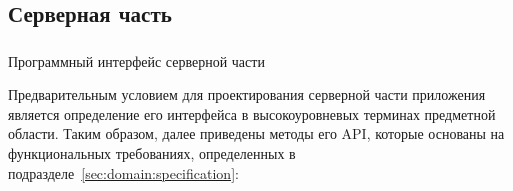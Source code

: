 \subsection{Серверная часть}
\label{sec:design:server}

\subsubsection{} Программный интерфейс серверной части
\label{sec:design:server:interface}

Предварительным условием для проектирования серверной части приложения является определение его интерфейса в высокоуровневых терминах предметной области. Таким образом, далее приведены методы его API, которые основаны на функциональных требованиях, определенных в подразделе~\ref{sec:domain:specification}:

